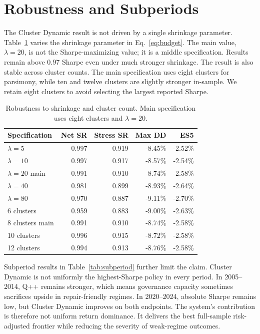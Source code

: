 \documentclass[sigconf,nonacm]{acmart}
\begin{document}
\section{Robustness and Subperiods}

The Cluster Dynamic result is not driven by a single shrinkage parameter. Table~\ref{tab:robust} varies the shrinkage parameter in Eq.~\eqref{eq:budget}. The main value, \(\lambda=20\), is not the Sharpe-maximizing value; it is a middle specification. Results remain above 0.97 Sharpe even under much stronger shrinkage. The result is also stable across cluster counts. The main specification uses eight clusters for parsimony, while ten and twelve clusters are slightly stronger in-sample. We retain eight clusters to avoid selecting the largest reported Sharpe.

\begin{table}[t]
\centering
\caption{Robustness to shrinkage and cluster count. Main specification uses eight clusters and \(\lambda=20\).}
\label{tab:robust}
\scriptsize
\setlength{\tabcolsep}{2.8pt}
\begin{tabular}{lrrrr}
\toprule
Specification & Net SR & Stress SR & Max DD & ES5 \\
\midrule
\(\lambda=5\) & 0.997 & 0.919 & -8.45\% & -2.52\% \\
\(\lambda=10\) & 0.997 & 0.917 & -8.57\% & -2.54\% \\
\(\lambda=20\) main & 0.991 & 0.910 & -8.74\% & -2.58\% \\
\(\lambda=40\) & 0.981 & 0.899 & -8.93\% & -2.64\% \\
\(\lambda=80\) & 0.970 & 0.887 & -9.11\% & -2.70\% \\
\midrule
6 clusters & 0.959 & 0.883 & -9.00\% & -2.63\% \\
8 clusters main & 0.991 & 0.910 & -8.74\% & -2.58\% \\
10 clusters & 0.996 & 0.915 & -8.72\% & -2.58\% \\
12 clusters & 0.994 & 0.913 & -8.76\% & -2.58\% \\
\bottomrule
\end{tabular}
\end{table}

Subperiod results in Table~\ref{tab:subperiod} further limit the claim. Cluster Dynamic is not uniformly the highest-Sharpe policy in every period. In 2005--2014, Q++ remains stronger, which means governance capacity sometimes sacrifices upside in repair-friendly regimes. In 2020--2024, absolute Sharpe remains low, but Cluster Dynamic improves on both endpoints. The system's contribution is therefore not uniform return dominance. It delivers the best full-sample risk-adjusted frontier while reducing the severity of weak-regime outcomes.
\end{document}
